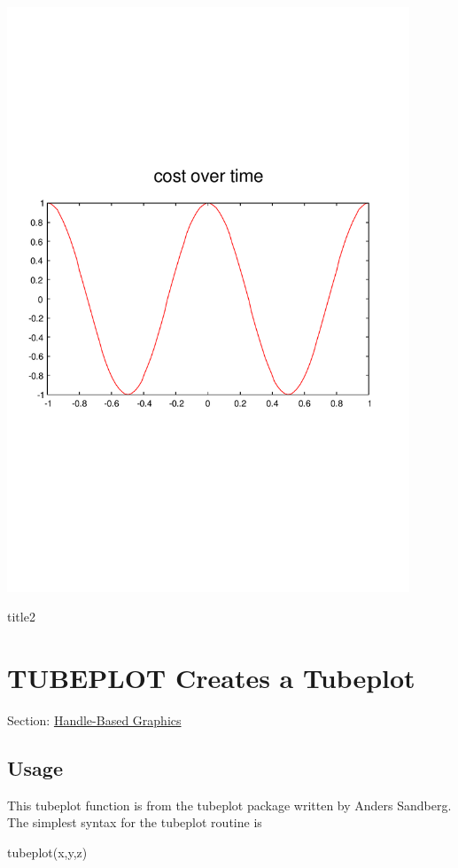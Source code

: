  
\begin{DoxyImage}
\includegraphics[width=12cm]{title2}
\caption{title2}
\end{DoxyImage}
 \hypertarget{handle_tubeplot}{}\section{T\-U\-B\-E\-P\-L\-O\-T Creates a Tubeplot}\label{handle_tubeplot}
Section\-: \hyperlink{sec_handle}{Handle-\/\-Based Graphics} \hypertarget{vtkwidgets_vtkxyplotwidget_Usage}{}\subsection{Usage}\label{vtkwidgets_vtkxyplotwidget_Usage}
This {\ttfamily tubeplot} function is from the tubeplot package written by Anders Sandberg. The simplest syntax for the {\ttfamily tubeplot} routine is \begin{DoxyVerb}    tubeplot(x,y,z)
\end{DoxyVerb}

